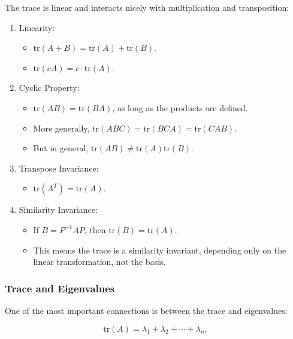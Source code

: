 \documentclass[
  letterpaper,
  DIV=11,
  numbers=noendperiod]{scrreprt}
\providecommand{\tightlist}{%
  \setlength{\itemsep}{0pt}\setlength{\parskip}{0pt}}
\begin{document}
The trace is linear and interacts nicely with multiplication and
transposition:

\begin{enumerate}
\def\labelenumi{\arabic{enumi}.}
\item
  Linearity:

  \begin{itemize}
  \tightlist
  \item
    \(\text{tr}(A + B) = \text{tr}(A) + \text{tr}(B)\).
  \item
    \(\text{tr}(cA) = c \cdot \text{tr}(A)\).
  \end{itemize}
\item
  Cyclic Property:

  \begin{itemize}
  \tightlist
  \item
    \(\text{tr}(AB) = \text{tr}(BA)\), as long as the products are
    defined.
  \item
    More generally,
    \(\text{tr}(ABC) = \text{tr}(BCA) = \text{tr}(CAB)\).
  \item
    But in general, \(\text{tr}(AB) \neq \text{tr}(A)\text{tr}(B)\).
  \end{itemize}
\item
  Transpose Invariance:

  \begin{itemize}
  \tightlist
  \item
    \(\text{tr}(A^T) = \text{tr}(A)\).
  \end{itemize}
\item
  Similarity Invariance:

  \begin{itemize}
  \tightlist
  \item
    If \(B = P^{-1}AP\), then \(\text{tr}(B) = \text{tr}(A)\).
  \item
    This means the trace is a similarity invariant, depending only on
    the linear transformation, not the basis.
  \end{itemize}
\end{enumerate}

\subsubsection{Trace and Eigenvalues}\label{trace-and-eigenvalues}

One of the most important connections is between the trace and
eigenvalues:

\[
\text{tr}(A) = \lambda_1 + \lambda_2 + \cdots + \lambda_n,
\]
\end{document}
